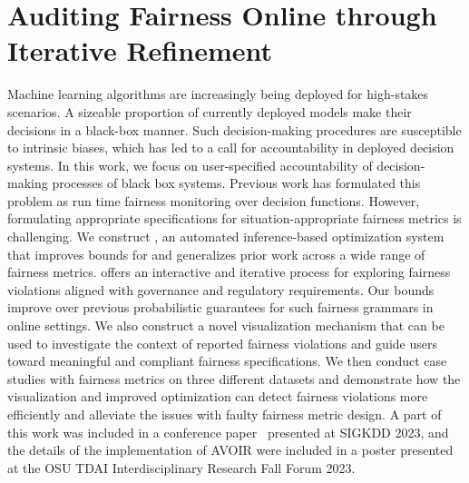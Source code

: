 \chapter{Auditing Fairness Online through Iterative Refinement}
\label{chp:avoir}

Machine learning algorithms are increasingly being deployed for high-stakes scenarios. 
A sizeable proportion of currently deployed models make their decisions in a black-box manner. 
Such decision-making procedures are susceptible to intrinsic biases, which has led to a call for accountability in deployed decision systems.
In this work, we focus on user-specified accountability of decision-making processes of black box systems.
Previous work has formulated this problem as run time fairness monitoring over decision functions.
However, formulating appropriate specifications for situation-appropriate fairness metrics is challenging.
We construct \AVOIRmethodname{}, an automated inference-based optimization system that improves bounds for and generalizes prior work across a wide range of fairness metrics.
\AVOIRmethodname{} offers an interactive and iterative process for exploring fairness violations aligned with governance and regulatory requirements.
Our bounds improve over previous probabilistic guarantees for such fairness grammars in online settings.
We also construct a novel visualization mechanism that can be used to investigate the context of reported fairness violations and guide users toward meaningful and compliant fairness specifications. 
We then conduct case studies with fairness metrics on three different datasets and demonstrate how the visualization and improved optimization can detect fairness violations more efficiently and alleviate the issues with faulty fairness metric design. 
A part of this work was included in a conference paper~\citep{maneriker2023online} presented at SIGKDD 2023, and the details of the implementation of AVOIR were included in a poster presented at the OSU TDAI Interdisciplinary Research Fall Forum 2023.










\endinput